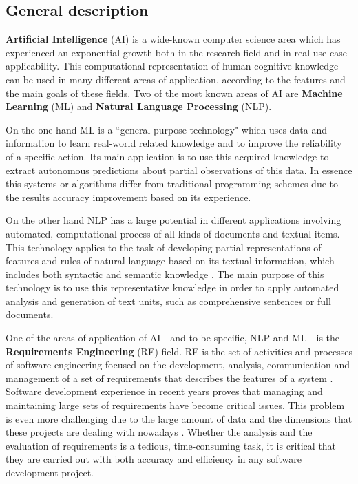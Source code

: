 \documentclass[11pt]{article}
\begin{document}
\subsection{General description}
\label{sec:general_introduction}

\textbf{Artificial Intelligence} (AI) is a wide-known computer science area which has experienced an exponential growth both in the research field and in real use-case applicability. This computational representation of human cognitive knowledge can be used in many different areas of application, according to the features and the main goals of these fields. Two of the most known areas of AI are \textbf{Machine Learning} (ML) and \textbf{Natural Language Processing} (NLP).

On the one hand ML is a ``general purpose technology"\cite{b8} which uses data and information to learn real-world related knowledge and to improve the reliability of a specific action. Its main application is to use this acquired knowledge to extract autonomous predictions about partial observations of this data. In essence this systems or algorithms differ from traditional programming schemes due to the results accuracy improvement based on its experience.

On the other hand NLP has a large potential in different applications involving automated, computational process of all kinds of documents and textual items. This technology applies to the task of developing partial representations of features and rules of natural language based on its textual information, which includes both syntactic and semantic knowledge \cite{b1}.  The main purpose of this technology is to use this representative knowledge in order to apply automated analysis and generation of text units, such as comprehensive sentences or full documents.

One of the areas of application of AI - and to be specific, NLP and ML - is the \textbf{Requirements Engineering} (RE) field. RE is the set of activities and processes of software engineering focused on the development, analysis, communication and management of a set of requirements that describes the features of a system \cite{b2}. Software development experience in recent years proves that managing and maintaining large sets of requirements have become critical issues. This problem is even more challenging due to the large amount of data and the dimensions that these projects are dealing with nowadays \cite{b3}. Whether the analysis and the evaluation of requirements is a tedious, time-consuming task,  it is critical that they are carried out with both accuracy and efficiency in any software development project.
\end{document}
